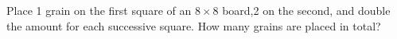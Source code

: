 Place 1 grain on the first square of an $8\times8$ board,2 on the second, and double the amount for each successive square. How many grains are placed in total?
